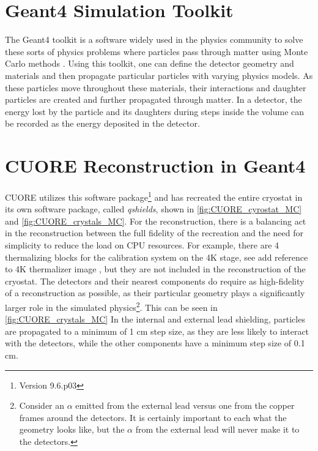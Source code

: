 \section{Geant4 Simulation Toolkit}
The Geant4 toolkit is a software widely used in the physics community to solve these sorts of physics problems where particles pass through matter using Monte Carlo methods \cite{AGOSTINELLI2003250, 528223, ALLISON2016186}.
Using this toolkit, one can define the detector geometry and materials and then propagate particular particles with varying physics models.
As these particles move throughout these materials, their interactions and daughter particles are created and further propagated through matter.
In a detector, the energy lost by the particle and its daughters during steps inside the volume can be recorded as the energy deposited in the detector.

\section{CUORE Reconstruction in Geant4}
CUORE utilizes this software package\footnote{Version 9.6.p03} and has recreated the entire cryostat in its own software package, called \textit{qshields}, shown in \autoref{fig:CUORE_cyrostat_MC} and \autoref{fig:CUORE_crystals_MC}.
For the reconstruction, there is a balancing act in the reconstruction between the full fidelity of the recreation and the need for simplicity to reduce the load on CPU resources.
For example, there are 4 thermalizing blocks for the calibration system on the 4K stage, see \color{red}add reference to 4K thermalizer image \color{black}, but they are not included in the reconstruction of the cryostat.
The detectors and their nearest components do require as high-fidelity of a reconstruction as possible, as their particular geometry plays a significantly larger role in the simulated physics\footnote{Consider an $\alpha$ emitted from the external lead versus one from the copper frames around the detectors.
It is certainly important to each what the geometry looks like, but the $\alpha$ from the external lead will never make it to the detectors.}.
This can be seen in \autoref{fig:CUORE_crystals_MC}
In the internal and external lead shielding, particles are propagated to a minimum of 1 cm step size, as they are less likely to interact with the detectors, while the other components have a minimum step size of 0.1 cm.

